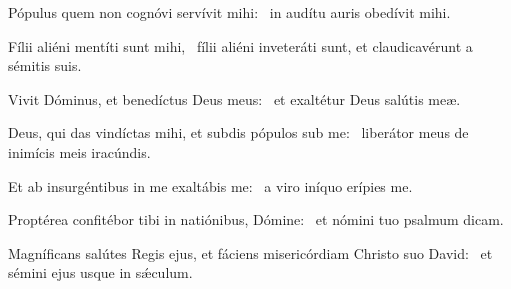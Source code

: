\item Pópulus quem non cognóvi servívit mihi:~\psstar{} in audítu auris obedívit mihi.

\item Fílii aliéni mentíti sunt mihi,~\psstar{} fílii aliéni inveteráti sunt, et claudicavérunt a sémitis suis.

\item Vivit Dóminus, et benedíctus Deus meus:~\psstar{} et exaltétur Deus salútis meæ.

\item Deus, qui das vindíctas mihi, et subdis pópulos sub me:~\psstar{} liberátor meus de inimícis meis iracúndis.

\item Et ab insurgéntibus in me exaltábis me:~\psstar{} a viro iníquo erípies me.

\item Proptérea confitébor tibi in natiónibus, Dómine:~\psstar{} et nómini tuo psalmum dicam.

\item Magníficans salútes Regis ejus, et fáciens misericórdiam Christo suo David:~\psstar{} et sémini ejus usque in sǽculum.